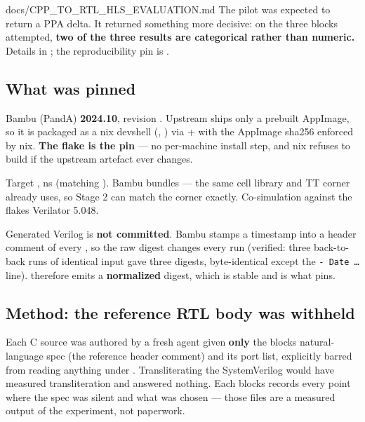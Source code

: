\begin{relocated}{docs/CPP_TO_RTL_HLS_EVALUATION.md}
The pilot was expected to return a PPA delta. It returned something more
decisive: on the three blocks attempted, \textbf{two of the three
results are categorical rather than numeric.} Details in
; the reproducibility pin is
.

\subsection{What was pinned}\label{tm:dec:cpp-to-rtl-hls-evaluation:what-was-pinned}

Bambu (PandA) \textbf{2024.10}, revision
. Upstream ships
only a prebuilt AppImage, so it is packaged as a nix devshell
(, ) via
 +  with the AppImage
sha256 enforced by nix. \textbf{The flake is the pin} --- no per-machine
install step, and nix refuses to build if the upstream artefact ever
changes.

Target ,  ns
(matching ). Bambu bundles
 --- the same cell
library and TT corner  already uses, so
Stage 2 can match the corner exactly. Co-simulation against the
flake\textquotesingle s Verilator 5.048.

Generated Verilog is \textbf{not committed}. Bambu stamps a timestamp
into a header comment of every , so the raw digest changes
every run (verified: three back-to-back runs of identical input gave
three digests, byte-identical except the
\texttt{-\allowbreak{}\ Date\ …} line). 
therefore emits a \textbf{normalized} digest, which is stable and is
what  pins.

\subsection{Method: the reference RTL body was withheld}\label{tm:dec:cpp-to-rtl-hls-evaluation:method-the-reference-rtl-body-was-withheld}

Each C source was authored by a fresh agent given \textbf{only} the
block\textquotesingle s natural-language spec (the reference 
header comment) and its port list, explicitly barred from reading
anything under . Transliterating the SystemVerilog would have
measured transliteration and answered nothing. Each
block\textquotesingle s  records every point where
the spec was silent and what was chosen --- those files are a measured
output of the experiment, not paperwork.


\end{relocated}
